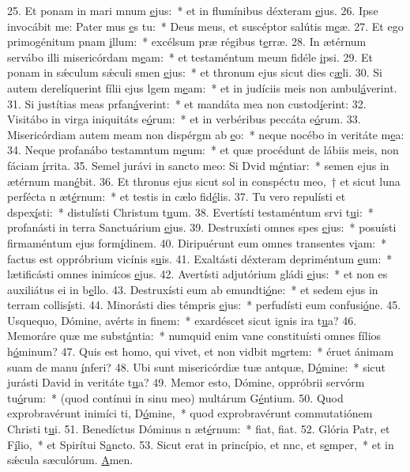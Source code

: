 25. Et ponam in mari mnum \uline{e}jus:~* et in flumínibus déxteram \uline{e}jus.
26. Ipse invocábit me: Pater mus \uline{e}s tu:~* Deus meus, et suscéptor salútis m\uline{e}æ.
27. Et ego primogénitum pnam \uline{i}llum:~* excélsum præ régibus t\uline{e}rræ.
28. In ætérnum servábo illi misericórdam m\uline{e}am:~* et testaméntum meum fidéle \uline{i}psi.
29. Et ponam in sǽculum sǽculi smen \uline{e}jus:~* et thronum ejus sicut dies c\uline{æ}li.
30. Si autem derelíquerint fílii ejus lgem m\uline{e}am:~* et in judíciis meis non ambul\uline{á}verint.
31. Si justítias meas prfan\uline{á}verint:~* et mandáta mea non custod\uline{í}erint:
32. Visitábo in virga iniquitáts e\uline{ó}rum:~* et in verbéribus peccáta e\uline{ó}rum.
33. Misericórdiam autem meam non dispérgm ab \uline{e}o:~* neque nocébo in veritáte m\uline{e}a:
34. Neque profanábo testamntum m\uline{e}um:~* et quæ procédunt de lábiis meis, non fáciam \uline{í}rrita.
35. Semel jurávi in sancto meo: Si Dvid m\uline{é}ntiar:~* semen ejus in ætérnum man\uline{é}bit.
36. Et thronus ejus sicut sol in conspéctu meo,~† et sicut luna perfécta n æt\uline{é}rnum:~* et testis in cælo fid\uline{é}lis.
37. Tu vero repulísti et dspex\uline{í}sti:~* distulísti Christum t\uline{u}um.
38. Evertísti testaméntum srvi t\uline{u}i:~* profanásti in terra Sanctuárium \uline{e}jus.
39. Destruxísti omnes spes \uline{e}jus:~* posuísti firmaméntum ejus form\uline{í}dinem.
40. Diripuérunt eum omnes transentes v\uline{i}am:~* factus est oppróbrium vicínis s\uline{u}is.
41. Exaltásti déxteram depriméntum \uline{e}um:~* lætificásti omnes inimícos \uline{e}jus.
42. Avertísti adjutórium gládi \uline{e}jus:~* et non es auxiliátus ei in b\uline{e}llo.
43. Destruxísti eum ab emundti\uline{ó}ne:~* et sedem ejus in terram collis\uline{í}sti.
44. Minorásti dies témpris \uline{e}jus:~* perfudísti eum confusi\uline{ó}ne.
45. Usquequo, Dómine, avérts in f\uline{i}nem:~* exardéscet sicut ignis ira t\uline{u}a?
46. Memoráre quæ me subst\uline{á}ntia:~* numquid enim vane constituísti omnes fílios h\uline{ó}minum?
47. Quis est homo, qui vivet, et non vidbit m\uline{o}rtem:~* éruet ánimam suam de manu \uline{í}nferi?
48. Ubi sunt misericórdiæ tuæ antquæ, D\uline{ó}mine:~* sicut jurásti David in veritáte t\uline{u}a?
49. Memor esto, Dómine, oppróbrii servórm tu\uline{ó}rum:~* (quod contínui in sinu meo) multárum G\uline{é}ntium.
50. Quod exprobravérunt inimíci ti, D\uline{ó}mine,~* quod exprobravérunt commutatiónem Christi t\uline{u}i.
51. Benedíctus Dóminus n æt\uline{é}rnum:~* fiat, f\uline{i}at.
52. Glória Patr, et F\uline{í}lio,~* et Spirítui S\uline{a}ncto.
53. Sicut erat in princípio, et nnc, et s\uline{e}mper,~* et in sǽcula sæculórum. \uline{A}men.
